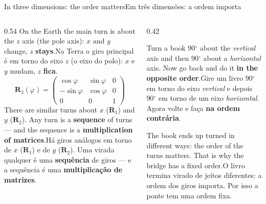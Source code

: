 \documentclass[aspectratio=169,11pt]{beamer}
\newcommand{\tr}[2]{\ifEN#2\else#1\fi}
\newcommand{\bnum}[1]{\textbf{\textcolor{mTeal}{#1}}}
\newcommand{\gr}{\ensuremath{{}^{\circ}}}
\begin{document}
\begin{frame}{\tr{Em três dimensões: a ordem importa}{In three dimensions: the order matters}}
  \begin{columns}[T]
    \begin{column}{0.54\textwidth}
      \small
      \tr{Na Terra o giro principal é em torno do eixo $z$ (o eixo do polo): $x$ e $y$ mudam, $z$ \bnum{fica}.}{On the Earth the main turn is about the $z$ axis (the pole axis): $x$ and $y$ change, $z$ \bnum{stays}.}
      \[ \mathbf{R}_3(\varphi) = \begin{pmatrix} \cos\varphi & \sin\varphi & 0 \\ -\sin\varphi & \cos\varphi & 0 \\ 0 & 0 & 1 \end{pmatrix} \]
      \tr{Há giros análogos em torno de $x$ ($\mathbf{R}_1$) e de $y$ ($\mathbf{R}_2$). Uma virada qualquer é uma \bnum{sequência} de giros --- e a sequência é uma \bnum{multiplicação de matrizes}.}{There are similar turns about $x$ ($\mathbf{R}_1$) and $y$ ($\mathbf{R}_2$). Any turn is a \bnum{sequence} of turns --- and the sequence is a \bnum{multiplication of matrices}.}
    \end{column}
    \begin{column}{0.42\textwidth}
      \begin{cuidado}[title={\tr{Experimente com um livro}{Try it with a book}}]
        \small\tr{Gire um livro $90\gr$ em torno do eixo \emph{vertical} e depois $90\gr$ em torno de um eixo \emph{horizontal}. Agora volte e faça \bnum{na ordem contrária}.}{Turn a book $90\gr$ about the \emph{vertical} axis and then $90\gr$ about a \emph{horizontal} axis. Now go back and do it \bnum{in the opposite order}.}
        \medskip

        \tr{O livro termina virado de \alert{jeitos diferentes}: a ordem dos giros importa. Por isso a ponte tem uma ordem fixa.}{The book ends up turned \alert{in different ways}: the order of the turns matters. That is why the bridge has a fixed order.}
      \end{cuidado}
    \end{column}
  \end{columns}
\end{frame}
\end{document}
